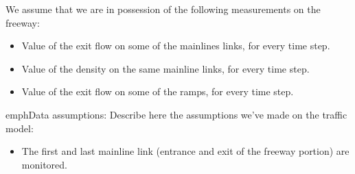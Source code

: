 We assume that we are in possession of the following measurements on the freeway:
\begin{itemize}
	\item Value of the exit flow on some of the mainlines links, for every time step.
	\item Value of the density on the same mainline links, for every time step.
	\item Value of the exit flow on some of the ramps, for every time step.
\end{itemize}

emph{Data assumptions:} \color{red}Describe here the assumptions we've made on the traffic model:\color{black}
\begin{itemize}
	\item The first and last mainline link (entrance and exit of the freeway portion) are monitored. 
\end{itemize}